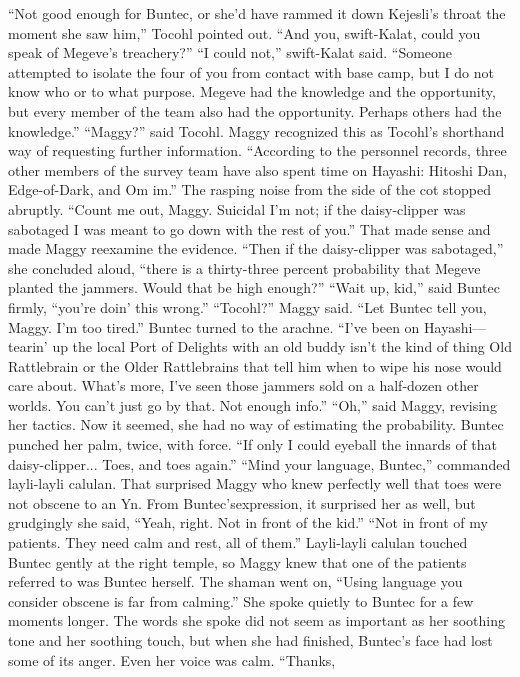 \documentclass[9pt]{article}
\begin{document}
“Not good enough for Buntec, or she’d have rammed it down Kejesli’s throat the moment she saw
him,” Tocohl pointed out. “And you, swift-Kalat, could you speak of Megeve’s treachery?”
“I could not,” swift-Kalat said. “Someone attempted to isolate the four of you from contact with base
camp, but I do not know who or to what purpose. Megeve had the knowledge and the opportunity, but
every member of the team also had the opportunity. Perhaps others had the knowledge.”
“Maggy?” said Tocohl.
Maggy recognized this as Tocohl’s shorthand way of requesting further information. “According to
the personnel records, three other members of the survey team have also spent time on Hayashi: Hitoshi
Dan, Edge-of-Dark, and Om im.”
The rasping noise from the side of the cot stopped abruptly. “Count me out, Maggy. Suicidal I’m not;
if the daisy-clipper was sabotaged I was meant to go down with the rest of you.”
That made sense and made Maggy reexamine the evidence. “Then if the daisy-clipper was
sabotaged,” she concluded aloud, “there is a thirty-three percent probability that Megeve planted the
jammers. Would that be high enough?”
“Wait up, kid,” said Buntec firmly, “you’re doin’ this wrong.”
“Tocohl?” Maggy said.
“Let Buntec tell you, Maggy. I’m too tired.”
Buntec turned to the arachne. “I’ve been on Hayashi—tearin’ up the local Port of Delights with an
old buddy isn’t the kind of thing Old Rattlebrain or the Older Rattlebrains that tell him when to wipe his
nose would care about. What’s more, I’ve seen those jammers sold on a half-dozen other worlds. You
can’t just go by that. Not enough info.”
“Oh,” said Maggy, revising her tactics. Now it seemed, she had no way of estimating the probability.
Buntec punched her palm, twice, with force. “If only I could eyeball the innards of that
daisy-clipper... Toes, and toes again.”
“Mind your language, Buntec,” commanded layli-layli calulan.
That surprised Maggy who knew perfectly well that toes were not obscene to an Yn. From Buntec’sexpression, it surprised her as well, but grudgingly she said, “Yeah, right. Not in front of the kid.”
“Not in front of my patients. They need calm and rest, all of them.” Layli-layli calulan touched
Buntec gently at the right temple, so Maggy knew that one of the patients referred to was Buntec herself.
The shaman went on, “Using language you consider obscene is far from calming.” She spoke quietly to
Buntec for a few moments longer.
The words she spoke did not seem as important as her soothing tone and her soothing touch, but
when she had finished, Buntec’s face had lost some of its anger. Even her voice was calm. “Thanks,
\end{document}
